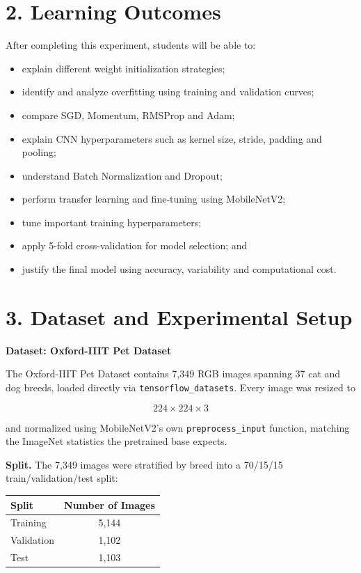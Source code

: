 \documentclass[10pt]{article}
\begin{document}
\section*{2. Learning Outcomes}

After completing this experiment, students will be able to:

\begin{itemize}
\item explain different weight initialization strategies;
\item identify and analyze overfitting using training and validation curves;
\item compare SGD, Momentum, RMSProp and Adam;
\item explain CNN hyperparameters such as kernel size, stride, padding and pooling;
\item understand Batch Normalization and Dropout;
\item perform transfer learning and fine-tuning using MobileNetV2;
\item tune important training hyperparameters;
\item apply 5-fold cross-validation for model selection; and
\item justify the final model using accuracy, variability and computational cost.
\end{itemize}

\section*{3. Dataset and Experimental Setup}

\textbf{Dataset: Oxford-IIIT Pet Dataset}

The Oxford-IIIT Pet Dataset contains 7{,}349 RGB images spanning 37 cat
and dog breeds, loaded directly via \texttt{tensorflow\_datasets}. Every
image was resized to

\[
224\times224\times3
\]

and normalized using MobileNetV2's own \texttt{preprocess\_input}
function, matching the ImageNet statistics the pretrained base expects.

\textbf{Split.} The 7{,}349 images were stratified by breed into a
70/15/15 train/validation/test split:

\begin{center}
\begin{tabular}{|l|c|}
\hline
Split & Number of Images\\
\hline
Training & 5{,}144\\
Validation & 1{,}102\\
Test & 1{,}103\\
\hline
\end{tabular}
\end{center}
\end{document}
